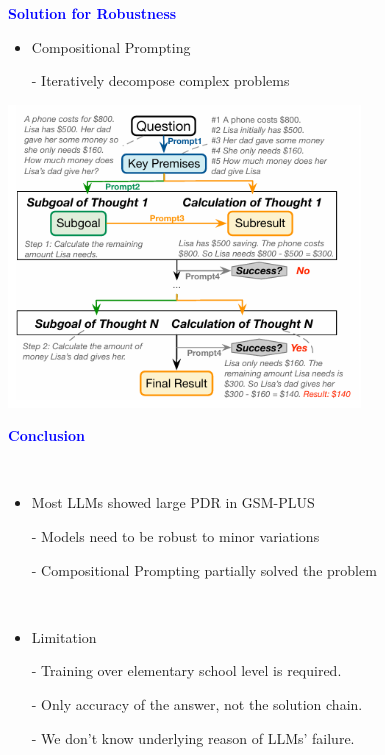 \documentclass[professionalfont]{beamer}
\begin{document}
\begin{frame}
\begin{center}
    { \textbf{\textcolor{blue}{ {\fontsize{12}{14}\selectfont Solution for Robustness} }} }
\end{center}

{\fontsize{10}{14}\selectfont 
\begin{itemize}
    \item Compositional Prompting
    
    - Iteratively decompose complex problems
\end{itemize}
}

\begin{center}
    \includegraphics[width=0.7\textwidth]{figure5.png}
\end{center}

\end{frame}

\begin{frame}
\begin{center}
    { \textbf{\textcolor{blue}{ {\fontsize{12}{14}\selectfont Conclusion} }} }
\end{center}
\\[0.5cm]

{\fontsize{10}{14}\selectfont 
\begin{itemize}
    \item Most LLMs showed large PDR in GSM-PLUS
    
    - Models need to be robust to minor variations
    
    - Compositional Prompting partially solved the problem
\end{itemize}
\\[0.5cm]
\begin{itemize}
    \item Limitation
    
    - Training over elementary school level is required.
    
    - Only accuracy of the answer, not the solution chain.

    - We don't know underlying reason of LLMs' failure.
\end{itemize}
}

\end{frame}
\end{document}
